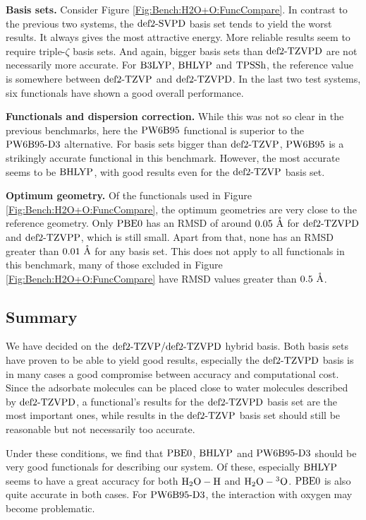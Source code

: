 \textbf{Basis sets.} Consider Figure \ref{Fig:Bench:H2O+O:FuncCompare}. In
contrast to the previous two systems, the $\text{def2-SVPD}$ basis set tends to yield the
worst results. It always gives the most attractive energy. More reliable
results seem to require triple-$\zeta$ basis sets. And again, bigger basis sets
than $\text{def2-TZVPD}$ are not necessarily more accurate. For $\text{B3LYP}$, $\text{BHLYP}$ and
$\text{TPSSh}$, the reference value is somewhere between $\text{def2-TZVP}$ and $\text{def2-TZVPD}$.
In the last two test systems, six functionals have shown a good overall
performance.

\textbf{Functionals and dispersion correction.}
While this was not so clear in the previous benchmarks, here the $\text{PW6B95}$
functional is superior to the $\text{PW6B95}\text{-D3}$ alternative. For basis sets
bigger than $\text{def2-TZVP}$, $\text{PW6B95}$ is a strikingly accurate functional in this benchmark.
However, the most accurate seems to be $\text{BHLYP}$, with good results even for
the $\text{def2-TZVP}$ basis set.

\textbf{Optimum geometry.} Of the functionals used in Figure
\ref{Fig:Bench:H2O+O:FuncCompare}, the optimum geometries are very close to the
reference geometry. Only $\text{PBE0}$ has an RMSD of around $0.05~\mathring{\text{A}}$ for
$\text{def2-TZVPD}$ and $\text{def2-TZVPP}$, which is still small. Apart from that, none has an RMSD
greater than $0.01\ \Ang$ for any basis set. This
does not apply to all functionals in this benchmark, many of those excluded
in Figure \ref{Fig:Bench:H2O+O:FuncCompare} have RMSD values greater than $0.5\
\mathring{\text{A}}$.

\subsection{Summary}

We have decided on the $\text{def2-TZVP}/\text{def2-TZVPD}$ hybrid basis. Both basis sets
have proven to be able to yield good results, especially the $\text{def2-TZVPD}$ basis
is in many cases a good compromise between accuracy and computational cost.
Since the adsorbate molecules can be placed close to water molecules described
by $\text{def2-TZVPD}$, a functional's results for the $\text{def2-TZVPD}$ basis set are the most
important ones, while results in the $\text{def2-TZVP}$ basis set should still be
reasonable but not necessarily too accurate.

Under these conditions, we find that $\text{PBE0}$, $\text{BHLYP}$ and $\text{PW6B95}\text{-D3}$ should be
very good functionals for describing our system. Of these, especially $\text{BHLYP}$
seems to have a great accuracy for both $\mbox{\ensuremath{\text H _2 \text O-\text H}}$ and $\mbox{\ensuremath{\text H _2 \text O-\hspace{.2pt} ^3\text{O}}}$. $\text{PBE0}$ is also
quite accurate in both cases. For $\text{PW6B95}\text{-D3}$, the interaction with oxygen
may become problematic. 


